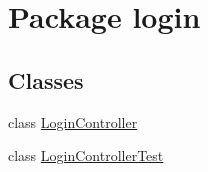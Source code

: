 \hypertarget{namespacelogin}{}\section{Package login}
\label{namespacelogin}
\subsection*{Classes}
\begin{DoxyCompactItemize}
\item 
class \hyperlink{classlogin_1_1_login_controller}{Login\+Controller}
\item 
class \hyperlink{classlogin_1_1_login_controller_test}{Login\+Controller\+Test}
\end{DoxyCompactItemize}
